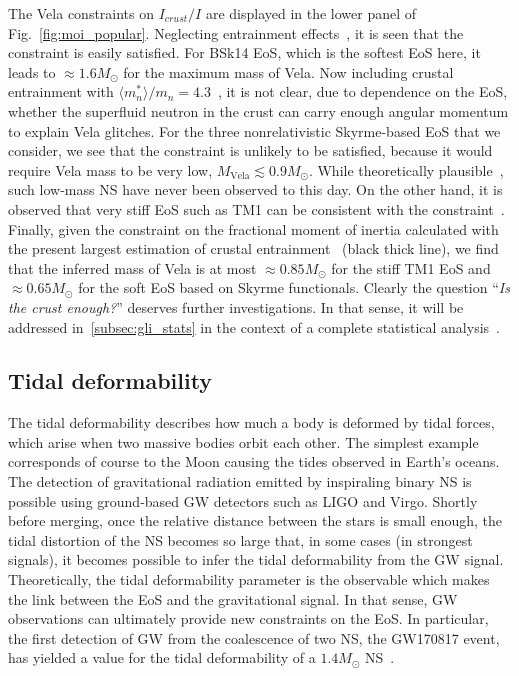 The Vela constraints on $I_{crust}/I$ are displayed in the lower panel of 
Fig.~\ref{fig:moi_popular}. Neglecting entrainment effects~\cite{Link1999}, it
is seen that the constraint is easily satisfied. For BSk14 EoS, which is the
softest EoS here, it leads to $\approx 1.6M_\odot$ for the maximum mass of 
Vela. Now including crustal entrainment with $\langle m_n^*\rangle/m_n =
4.3$~\cite{Andersson2012}, it is not clear, due to dependence on the EoS, 
whether the superfluid neutron in the crust can carry enough angular momentum 
to explain Vela glitches. For the three nonrelativistic Skyrme-based EoS that 
we consider, we see that the constraint is unlikely to be satisfied, because it
would require Vela mass to be very low, $M_{\text{Vela}} \lesssim 0.9M_\odot$.
While theoretically plausible~\cite{Haensel2007}, such low-mass NS have never 
been observed to this day. On the other hand, it is observed that very stiff 
EoS such as TM1 can be consistent with the constraint~\cite{Piekarewicz2014}.
Finally, given the constraint on the fractional moment of inertia calculated 
with the present largest estimation of crustal entrainment~\cite{Delsate2016}
(black thick line), we find that the inferred mass of Vela is at most 
$\approx 0.85M_\odot$ for the stiff TM1 EoS and $\approx 0.65M_\odot$ for the 
soft EoS based on Skyrme functionals. Clearly the question 
``\textit{Is the crust enough?}'' deserves further investigations. In that 
sense, it will be addressed in~\ref{subsec:gli_stats} in the context of a 
complete statistical analysis~\cite{Carreau2019moi}.

\subsection{Tidal deformability}\label{subsec:tidal} %

The tidal deformability describes how much a body is deformed by tidal forces,
which arise when two massive bodies orbit each other. The simplest example
corresponds of course to the Moon causing the tides observed in Earth's 
oceans.
The detection of gravitational radiation emitted by inspiraling binary NS 
is possible using ground-based GW detectors such as LIGO 
and Virgo. 
Shortly before merging, once the relative distance between the stars is small
enough, the tidal distortion of the NS becomes so large that, in some cases (in
strongest signals), it becomes possible to infer the tidal deformability from 
the GW signal. Theoretically, the tidal deformability parameter is the 
observable which makes the link between the EoS and the gravitational signal. 
In that sense, GW observations can ultimately provide new constraints on the 
EoS. In particular, the first detection of GW from the coalescence of two NS, 
the GW170817 event, has yielded a value for the tidal deformability of a 
$1.4M_\odot$ NS~\cite{GW1}.

